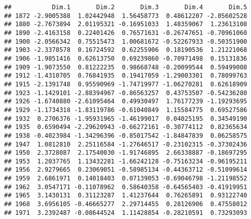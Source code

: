 \documentclass[
]{article}
\newenvironment{Shaded}{\begin{snugshade}}{\end{snugshade}}
\newcommand{\NormalTok}[1]{#1}
\newcommand{\SpecialCharTok}[1]{\textcolor[rgb]{0.00,0.00,0.00}{#1}}
\begin{document}
\begin{verbatim}
##           Dim.1       Dim.2       Dim.3       Dim.4       Dim.5
## 1872 -2.9005388  1.02442948  1.56458773  0.48612207 -2.05602528
## 1880 -2.7673894  2.01195321 -0.16951033  1.48359067  1.23613108
## 1890 -2.4163158  0.22401426  0.76571631 -0.26747651 -0.70961060
## 1900 -2.0566342  0.75515473  1.00681672 -0.52267933 -0.50351900
## 1903 -2.3378578  0.16724592  0.62255906  0.18190536  1.21221068
## 1906 -1.9851416  0.62613750  0.69239860 -0.70971498  0.15131836
## 1909 -1.9073550  0.81222235  0.98668748 -0.20099544  0.59499008
## 1912 -1.4310705  0.76841935  0.19417059 -1.29003301  0.78099763
## 1915 -2.1391748  0.95590969 -1.74719977 -1.06270281  0.62618909
## 1923 -1.1429101 -2.88394967 -0.86563257  0.43753507 -0.54236280
## 1926 -1.6740880 -2.61095464  0.49930497  1.76177239 -1.19293695
## 1929 -1.1734318 -1.83119786 -0.61040849  1.15584775  0.69527586
## 1932  0.2706376 -1.95931965 -1.46199017  0.04025195  0.34549190
## 1935  0.6590494 -2.29620943 -0.66272161 -0.30774112  0.82365634
## 1938 -0.4023984 -1.34296396 -0.85017542 -1.84847839  0.06258575
## 1947  1.0812810  2.25116584 -1.27646517 -0.23102315 -0.37302436
## 1950  2.3728087  2.17540030 -1.91746895  2.66338887 -0.18697295
## 1953  1.2037765  1.13432281 -1.66242128 -0.75163234 -0.96195211
## 1956  2.9279665  0.23069051 -0.58985134 -0.44363712 -0.51099614
## 1959  2.6861971  0.14018403  0.07139053 -0.69046798 -1.21198552
## 1962  3.0547171 -0.11078962  0.58640358 -0.64565403 -0.41919951
## 1965  3.1430131  0.31123287  1.41237644  0.76265891  0.93122740
## 1968  3.6956105 -0.46665277  2.29714455  0.28126906  0.47558012
## 1971  3.2392487 -0.08644524  1.11428854 -0.28210591  0.73293093
\end{verbatim}

\begin{Shaded}
\end{Shaded}
\end{document}

